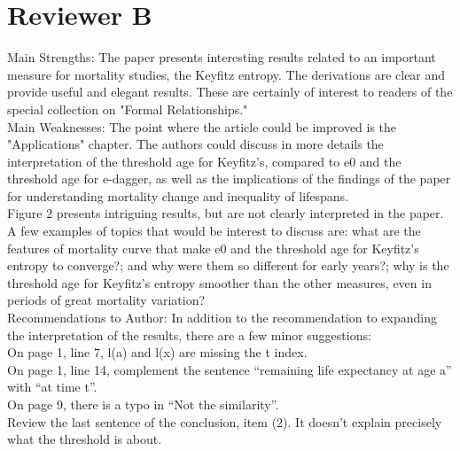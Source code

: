 \documentclass[a4paper,twoside, openright, 12pt, leqno]{article}
\begin{document}
\section*{Reviewer B}
Main Strengths:
The paper presents interesting results related to an important measure for mortality studies, the Keyfitz entropy. The derivations are clear and provide useful and elegant results. These are certainly of interest to readers of the special collection on "Formal Relationships."\\

Main Weaknesses:
The point where the article could be improved is the "Applications" chapter. The authors could discuss in more details the interpretation of the threshold age for Keyfitz's, compared to e0 and the threshold age for e-dagger, as well as the implications of the findings of the paper for understanding mortality change and inequality of lifespans.\\

Figure 2 presents intriguing results, but are not clearly interpreted in the paper. A few examples of topics that would be interest to discuss are: what are the features of mortality curve that make e0 and the threshold age for Keyfitz's entropy to converge?; and why were them so different for early years?; why is the threshold age for Keyfitz's entropy smoother than the other measures, even in periods of great mortality variation?\\

Recommendations to Author:
In addition to the recommendation to expanding the interpretation of the results, there are a few minor suggestions:\\
On page 1, line 7, l(a) and l(x) are missing the t index.\\
On page 1, line 14, complement the sentence “remaining life expectancy at age a” with “at time t”.\\
On page 9, there is a typo in “Not the similarity”. \\
Review the last sentence of the conclusion, item (2). It doesn’t explain precisely what the threshold is about.
\end{document}
